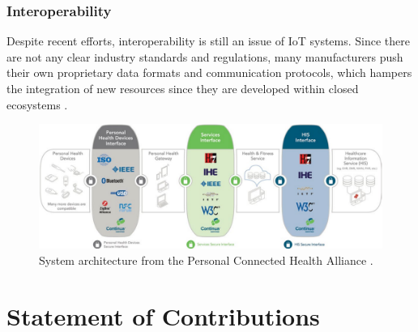 
\subsubsection{Interoperability}


Despite recent efforts, interoperability is still an issue of IoT systems. Since there are not any clear industry standards and regulations, many manufacturers push their own proprietary data formats and communication protocols, which hampers the integration of new resources since they are developed within closed ecosystems \cite{Rubi2019}. 




\begin{figure}[H]
    \centering
    \includegraphics[width=.90\linewidth]{images/cdg-architecutre.png}
    \caption{System architecture from the Personal Connected Health Alliance \cite{ContinuaHealthAlliance}.}
    \label{fig:continua-architecture}
\end{figure}

\section{Statement of Contributions}

